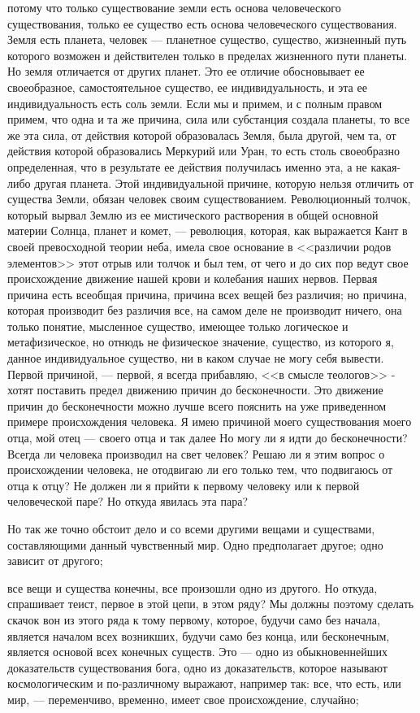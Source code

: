 \documentclass[12pt]{article}
\begin{document}
потому что только существование земли есть основа человеческого существования, только ее существо есть основа человеческого существования. Земля есть планета, человек --- планетное существо, существо, жизненный путь которого возможен и действителен только в пределах жизненного пути планеты. Но земля отличается от других планет. Это ее отличие обосновывает ее своеобразное, самостоятельное существо, ее индивидуальность, и эта ее индивидуальность есть соль земли. Если мы и примем, и с полным правом примем, что одна и та же причина, сила или субстанция создала планеты, то все же эта сила, от действия которой образовалась Земля, была другой, чем та, от действия которой образовались Меркурий или Уран, то есть столь своеобразно определенная, что в результате ее действия получилась именно эта, а не какая-либо другая планета. Этой индивидуальной причине, которую нельзя отличить от существа Земли, обязан человек своим существованием. Революционный толчок, который вырвал Землю из ее мистического растворения в общей основной материи Солнца, планет и комет, --- революция, которая, как выражается Кант в своей превосходной теории неба, имела свое основание в <<различии родов элементов>>  этот отрыв или толчок и был тем, от чего и до сих пор ведут свое происхождение движение нашей крови и колебания наших нервов. Первая причина есть всеобщая причина, причина всех вещей без различия; но причина, которая производит без различия все, на самом деле не производит ничего, она только понятие, мысленное существо, имеющее только логическое и метафизическое, но отнюдь не физическое значение, существо, из которого я, данное индивидуальное существо, ни в каком случае не могу себя вывести. Первой причиной, --- первой, я всегда прибавляю, <<в смысле теологов>> - хотят поставить предел движению причин до бесконечности. Это движение причин до бесконечности можно лучше всего пояснить на уже приведенном примере происхождения человека. Я имею причиной моего существования моего отца, мой отец --- своего отца и так далее Но могу ли я идти до бесконечности? Всегда ли человека производил на свет человек? Решаю ли я этим вопрос о происхождении человека, не отодвигаю ли его только тем, что подвигаюсь от отца к отцу? Не должен ли я прийти к первому человеку или к первой человеческой паре? Но откуда явилась эта пара? 

Но так же точно обстоит дело и со всеми другими вещами и существами, составляющими данный чувственный мир. Одно предполагает другое; одно зависит от другого; 

все вещи и существа конечны, все произошли одно из другого. Но откуда, спрашивает теист, первое в этой цепи, в этом ряду? Мы должны поэтому сделать скачок вон из этого ряда к тому первому, которое, будучи само без начала, является началом всех возникших, будучи само без конца, или бесконечным, является основой всех конечных существ. Это --- одно из обыкновеннейших доказательств существования бога, одно из доказательств, которое называют космологическим и по-различному выражают, например так: все, что есть, или мир, --- переменчиво, временно, имеет свое происхождение, случайно; 
\end{document}
